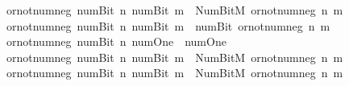 \begin{isabellebody}
{\isacharbar}{\kern0pt}\ {\isacartoucheopen}or{\isacharunderscore}{\kern0pt}not{\isacharunderscore}{\kern0pt}num{\isacharunderscore}{\kern0pt}neg\ {\isacharparenleft}{\kern0pt}num{\isachardot}{\kern0pt}Bit{}\ n{\isacharparenright}{\kern0pt}\ {\isacharparenleft}{\kern0pt}num{\isachardot}{\kern0pt}Bit{}\ m{\isacharparenright}{\kern0pt}\ {\isacharequal}{\kern0pt}\ Num{\isachardot}{\kern0pt}BitM\ {\isacharparenleft}{\kern0pt}or{\isacharunderscore}{\kern0pt}not{\isacharunderscore}{\kern0pt}num{\isacharunderscore}{\kern0pt}neg\ n\ m{\isacharparenright}{\kern0pt}{\isacartoucheclose}\isanewline
{\isacharbar}{\kern0pt}\ {\isacartoucheopen}or{\isacharunderscore}{\kern0pt}not{\isacharunderscore}{\kern0pt}num{\isacharunderscore}{\kern0pt}neg\ {\isacharparenleft}{\kern0pt}num{\isachardot}{\kern0pt}Bit{}\ n{\isacharparenright}{\kern0pt}\ {\isacharparenleft}{\kern0pt}num{\isachardot}{\kern0pt}Bit{}\ m{\isacharparenright}{\kern0pt}\ {\isacharequal}{\kern0pt}\ num{\isachardot}{\kern0pt}Bit{}\ {\isacharparenleft}{\kern0pt}or{\isacharunderscore}{\kern0pt}not{\isacharunderscore}{\kern0pt}num{\isacharunderscore}{\kern0pt}neg\ n\ m{\isacharparenright}{\kern0pt}{\isacartoucheclose}\isanewline
{\isacharbar}{\kern0pt}\ {\isacartoucheopen}or{\isacharunderscore}{\kern0pt}not{\isacharunderscore}{\kern0pt}num{\isacharunderscore}{\kern0pt}neg\ {\isacharparenleft}{\kern0pt}num{\isachardot}{\kern0pt}Bit{}\ n{\isacharparenright}{\kern0pt}\ num{\isachardot}{\kern0pt}One\ {\isacharequal}{\kern0pt}\ num{\isachardot}{\kern0pt}One{\isacartoucheclose}\isanewline
{\isacharbar}{\kern0pt}\ {\isacartoucheopen}or{\isacharunderscore}{\kern0pt}not{\isacharunderscore}{\kern0pt}num{\isacharunderscore}{\kern0pt}neg\ {\isacharparenleft}{\kern0pt}num{\isachardot}{\kern0pt}Bit{}\ n{\isacharparenright}{\kern0pt}\ {\isacharparenleft}{\kern0pt}num{\isachardot}{\kern0pt}Bit{}\ m{\isacharparenright}{\kern0pt}\ {\isacharequal}{\kern0pt}\ Num{\isachardot}{\kern0pt}BitM\ {\isacharparenleft}{\kern0pt}or{\isacharunderscore}{\kern0pt}not{\isacharunderscore}{\kern0pt}num{\isacharunderscore}{\kern0pt}neg\ n\ m{\isacharparenright}{\kern0pt}{\isacartoucheclose}\isanewline
{\isacharbar}{\kern0pt}\ {\isacartoucheopen}or{\isacharunderscore}{\kern0pt}not{\isacharunderscore}{\kern0pt}num{\isacharunderscore}{\kern0pt}neg\ {\isacharparenleft}{\kern0pt}num{\isachardot}{\kern0pt}Bit{}\ n{\isacharparenright}{\kern0pt}\ {\isacharparenleft}{\kern0pt}num{\isachardot}{\kern0pt}Bit{}\ m{\isacharparenright}{\kern0pt}\ {\isacharequal}{\kern0pt}\ Num{\isachardot}{\kern0pt}BitM\ {\isacharparenleft}{\kern0pt}or{\isacharunderscore}{\kern0pt}not{\isacharunderscore}{\kern0pt}num{\isacharunderscore}{\kern0pt}neg\ n\ m{\isacharparenright}{\kern0pt}{\isacartoucheclose}\isanewline

\end{isabellebody}
